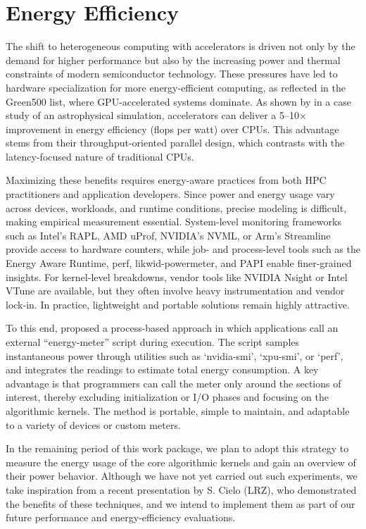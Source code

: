 \documentclass[a4paper,12pt]{article}
\begin{document}
\section{Energy Efficiency}

The shift to heterogeneous computing with accelerators is driven not only by the demand for higher performance but also by the increasing power and thermal constraints of modern semiconductor technology. These pressures have led to hardware specialization for more energy-efficient computing, as reflected in the Green500 list, where GPU-accelerated systems dominate. As shown by \cite{Cielo25} in a case study of an astrophysical simulation, accelerators can deliver a 5–10× improvement in energy efficiency (flops per watt) over CPUs. This advantage stems from their throughput-oriented parallel design, which contrasts with the latency-focused nature of traditional CPUs.

Maximizing these benefits requires energy-aware practices from both HPC practitioners and application developers. Since power and energy usage vary across devices, workloads, and runtime conditions, precise modeling is difficult, making empirical measurement essential. System-level monitoring frameworks such as Intel’s RAPL, AMD uProf, NVIDIA’s NVML, or Arm’s Streamline provide access to hardware counters, while job- and process-level tools such as the Energy Aware Runtime, perf, likwid-powermeter, and PAPI enable finer-grained insights. For kernel-level breakdowns, vendor tools like NVIDIA Nsight or Intel VTune are available, but they often involve heavy instrumentation and vendor lock-in. In practice, lightweight and portable solutions remain highly attractive.

To this end, \cite{Cielo25} proposed a process-based approach in which applications call an external ``energy-meter'' script during execution. The script samples instantaneous power through utilities such as `nvidia-smi', `xpu-smi', or `perf', and integrates the readings to estimate total energy consumption. A key advantage is that programmers can call the meter only around the sections of interest, thereby excluding initialization or I/O phases and focusing on the algorithmic kernels. The method is portable, simple to maintain, and adaptable to a variety of devices or custom meters. 

In the remaining period of this work package, we plan to adopt this strategy to measure the energy usage of the core algorithmic kernels and gain an overview of their power behavior. Although we have not yet carried out such experiments, we take inspiration from a recent presentation by S. Cielo (LRZ), who demonstrated the benefits of these techniques, and we intend to implement them as part of our future performance and energy-efficiency evaluations.
\end{document}
